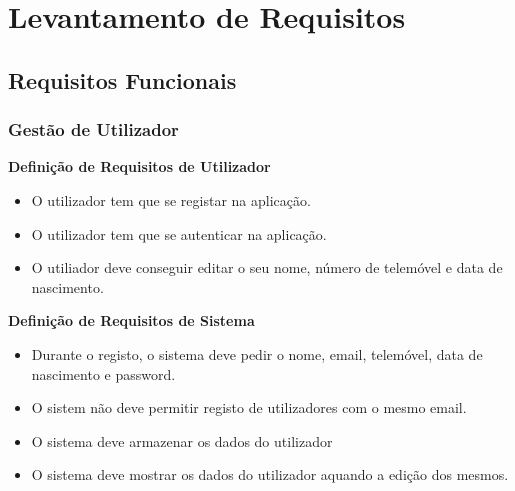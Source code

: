 \documentclass[a4paper]{report}
\begin{document}
\chapter{Levantamento de Requisitos}
    \section{Requisitos Funcionais}
        \subsection{Gestão de Utilizador}
            \textbf{Definição de Requisitos de Utilizador}
            \begin{itemize}
                \item O utilizador tem que se registar na aplicação.
                \item O utilizador tem que se autenticar na aplicação.
                \item O utiliador deve conseguir editar o seu nome, número
                de telemóvel e data de nascimento.
            \end{itemize}
            \textbf{Definição de Requisitos de Sistema}
            \begin{itemize}
                \item Durante o registo, o sistema deve pedir o nome, email,
                telemóvel, data de nascimento e password.
                \item O sistem não deve permitir registo de utilizadores com
                o mesmo email.
                \item O sistema deve armazenar os dados do utilizador
                \item O sistema deve mostrar os dados do utilizador aquando
                a edição dos mesmos.
            \end{itemize}
            
\end{document}

